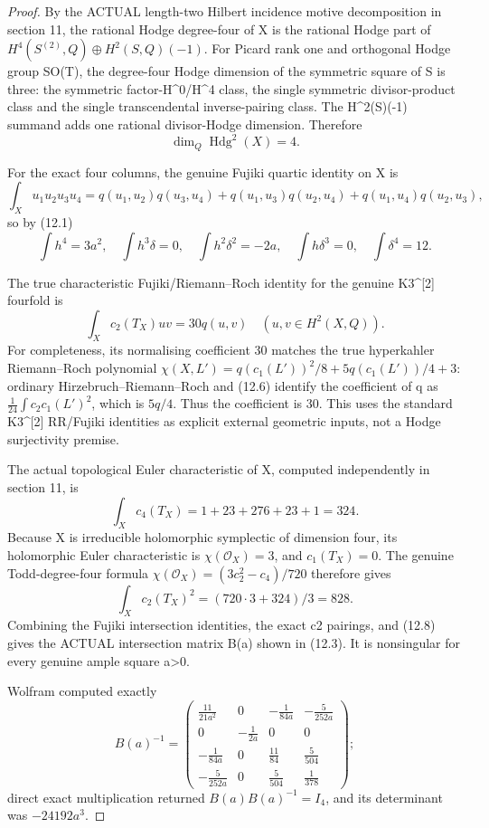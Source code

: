 \documentclass[11pt]{article}
\begin{document}
\begin{proof}
By the ACTUAL length-two
Hilbert incidence motive
decomposition in section 11,
the rational Hodge degree-four
of X is the rational Hodge
part of
\(
 H^4(S^{(2)},Q)\oplus H^2(S,Q)(-1)
\).
For Picard rank one and
orthogonal Hodge group SO(T),
the degree-four Hodge
dimension of the symmetric
square of S is three:
the symmetric factor-H^0/H^4
class, the single symmetric
divisor-product class and
the single transcendental
inverse-pairing class.
The H^2(S)(-1) summand
adds one rational
divisor-Hodge dimension.
Therefore
\[
             \dim_Q\operatorname{Hdg}^2(X)=4.
\]

For the exact four columns,
the genuine Fujiki
quartic identity on X is
\[
 \int_X u_1u_2u_3u_4
   =q(u_1,u_2)q(u_3,u_4)
    +q(u_1,u_3)q(u_2,u_4)
    +q(u_1,u_4)q(u_2,u_3),
                                                               \tag{12.6}
\]
so by (12.1)
\[
 \int h^4=3a^2,\quad
 \int h^3\delta=0,\quad
 \int h^2\delta^2=-2a,\quad
 \int h\delta^3=0,\quad
 \int\delta^4=12 .
\]

The true characteristic
Fujiki/Riemann--Roch identity
for the genuine K3^[2]
fourfold is
\[
 \boxed{\int_X c_2(T_X)u v
                 =30q(u,v)
                 \quad(u,v\in H^2(X,Q)).}         \tag{12.7}
\]
For completeness, its
normalising coefficient 30
matches the true hyperkahler
Riemann--Roch polynomial
\(
 \chi(X,L')=
       q(c_1(L'))^2/8+
       5q(c_1(L'))/4+3
\):
ordinary Hirzebruch--Riemann--Roch
and (12.6) identify the
coefficient of q as
\(\frac1{24}\int c_2 c_1(L')^2\),
which is \(5q/4\).
Thus the coefficient is 30.
This uses the standard
K3^[2] RR/Fujiki identities
as explicit external geometric
inputs, not a Hodge
surjectivity premise.

The actual topological
Euler characteristic of X,
computed independently in
section 11, is
\[
 \int_X c_4(T_X)=
       1+23+276+23+1=324 .
\]
Because X is irreducible
holomorphic symplectic
of dimension four,
its holomorphic Euler
characteristic is
\(\chi(\mathcal O_X)=3\),
and \(c_1(T_X)=0\).
The genuine Todd-degree-four
formula
\(
 \chi(\mathcal O_X)
   =(3c_2^2-c_4)/720
\)
therefore gives
\[
             \int_Xc_2(T_X)^2
                      =(720\cdot3+324)/3
                      =828.                        \tag{12.8}
\]
Combining the Fujiki
intersection identities,
the exact c2 pairings,
and (12.8) gives the
ACTUAL intersection matrix
B(a) shown in (12.3).
It is nonsingular for
every genuine ample
square a>0.

Wolfram computed exactly
\[
 \boxed{
 B(a)^{-1}=
 \begin{pmatrix}
 \frac{11}{21a^2}&0&
           -\frac1{84a}&-\frac5{252a}\\
 0&-\frac1{2a}&0&0\\
 -\frac1{84a}&0&
               \frac{11}{84}&\frac5{504}\\
 -\frac5{252a}&0&
               \frac5{504}&\frac1{378}
 \end{pmatrix};}                                  \tag{12.9}
\]
direct exact multiplication
returned \(B(a)B(a)^{-1}=I_4\),
and its determinant was
\(-24192a^3\).


\end{proof}
\end{document}
